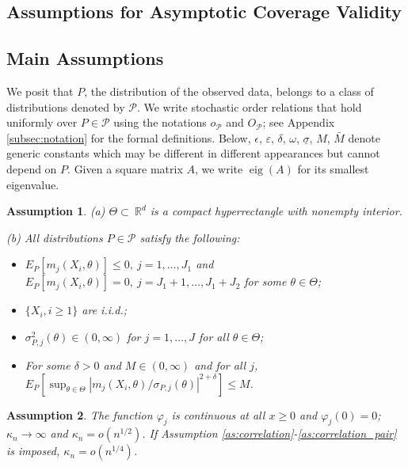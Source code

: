 \documentclass[letterpaper,11pt]{article}
\theoremstyle{myplain}
\theoremstyle{mydefinition}
\newtheorem{assumption}{Assumption}[section]
\theoremstyle{myremark}
\newcommand{\eig}{\operatorname{eig}}
\newcommand{\cP}{\mathcal{P}}
\numberwithin{equation}{section}
\numberwithin{figure}{section}
\begin{document}
\begin{appendices}
\section{Assumptions for Asymptotic Coverage Validity}
\label{app:all_ass}
\subsection{Main Assumptions}
\label{sec:AssRes}
We posit that $P$, the distribution of the observed data, belongs to a class of distributions denoted by $\cP$. We write stochastic order relations that hold uniformly over $P \in \cP$ using the notations $o_{\mathcal P}$ and $O_{\mathcal P}$; see Appendix \ref{subsec:notation} for the formal definitions.
Below, $\epsilon$, $\varepsilon$, $\delta$, $\omega$, $\underline{\sigma}$, $M$, $\bar{M}$ denote generic constants which may be different in different appearances but cannot depend on $P$. Given a square matrix $A$, we write $\eig(A)$ for its smallest eigenvalue.
\begin{assumption}
\label{as:momP_AS} (a) $\Theta\subset\mathbb{\ R}^{d}$ is a compact hyperrectangle with nonempty interior.

\noindent (b) All distributions $P \in \cP$ satisfy the following:
\begin{itemize}
\item[(i)] $E_P[m_j(X_i,\theta)]\le 0,~j=1,\dots,J_1$ and $E_{P}[m_j(X_i,\theta)]= 0,~j=J_1+1,\dots, J_1+J_2$ for some $\theta\in\Theta$;

\item[(ii)] $\{X_i, i\ge 1\}$ are i.i.d.;

\item[(iii)] $\sigma^2_{P,j}(\theta)\in(0,\infty)$ for $j=1,\dots, J$ for all $\theta\in\Theta$;

\item[(iv)] For some $\delta>0$ and $M\in (0,\infty)$ and for all $j$, $E_P[\sup_{\theta\in\Theta}|{m_{j}(X_i,\theta)}/{\sigma_{P,j}(\theta)}|^{2+\delta}]\le M$.
\end{itemize}
\end{assumption}
\begin{assumption}
\label{as:GMS}
The function $\varphi_j$ is continuous at all $x\ge 0$ and $\varphi_j(0)=0$; $\kappa_n \to \infty$ and $\kappa_n=o(n^{1/2})$. If Assumption \ref{as:correlation}-\ref{as:correlation_pair} is imposed, $\kappa_n=o(n^{1/4})$.
\end{assumption}


\end{appendices}
\end{document}
